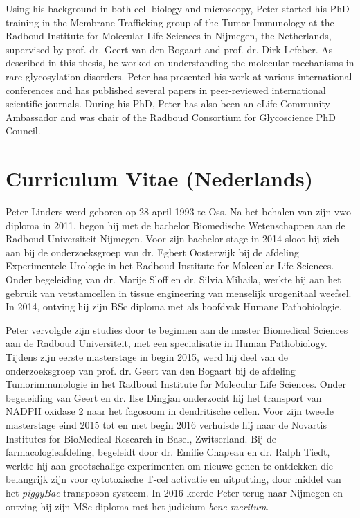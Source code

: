 Using his background in both cell biology and microscopy, Peter started his PhD training in the Membrane Trafficking group of the Tumor Immunology at the Radboud Institute for Molecular Life Sciences in Nijmegen, the Netherlands, supervised by prof. dr. Geert van den Bogaart and prof. dr. Dirk Lefeber. As described in this thesis, he worked on understanding the molecular mechanisms in rare glycosylation disorders. Peter has presented his work at various international conferences and has published several papers in peer-reviewed international scientific journals. During his PhD, Peter has also been an eLife Community Ambassador and was chair of the Radboud Consortium for Glycoscience PhD Council. 

\clearpage

\section{Curriculum Vitae (Nederlands)}

Peter Linders werd geboren op 28 april 1993 te Oss. Na het behalen van zijn vwo-diploma in 2011, begon hij met de bachelor Biomedische Wetenschappen aan de Radboud Universiteit Nijmegen. Voor zijn bachelor stage in 2014 sloot hij zich aan bij de onderzoeksgroep van dr. Egbert Oosterwijk bij de afdeling Experimentele Urologie in het Radboud Institute for Molecular Life Sciences. Onder begeleiding van dr. Marije Sloff en dr. Silvia Mihaila, werkte hij aan het gebruik van vetstamcellen in tissue engineering van menselijk urogenitaal weefsel. In 2014, ontving hij zijn BSc diploma met als hoofdvak Humane Pathobiologie.

Peter vervolgde zijn studies door te beginnen aan de master Biomedical Sciences aan de Radboud Universiteit, met een specialisatie in Human Pathobiology. Tijdens zijn eerste masterstage in begin 2015, werd hij deel van de onderzoeksgroep van prof. dr. Geert van den Bogaart bij de afdeling Tumorimmunologie in het Radboud Institute for Molecular Life Sciences. Onder begeleiding van Geert en dr. Ilse Dingjan onderzocht hij het transport van NADPH oxidase 2 naar het fagosoom in dendritische cellen. Voor zijn tweede masterstage eind 2015 tot en met begin 2016 verhuisde hij naar de Novartis Institutes for BioMedical Research in Basel, Zwitserland. Bij de farmacologieafdeling, begeleidt door dr. Emilie Chapeau en dr. Ralph Tiedt, werkte hij aan grootschalige experimenten om nieuwe genen te ontdekken die belangrijk zijn voor cytotoxische T-cel activatie en uitputting, door middel van het \emph{piggyBac} transposon systeem. In 2016 keerde Peter terug naar Nijmegen en ontving hij zijn MSc diploma met het judicium \emph{bene meritum}.

